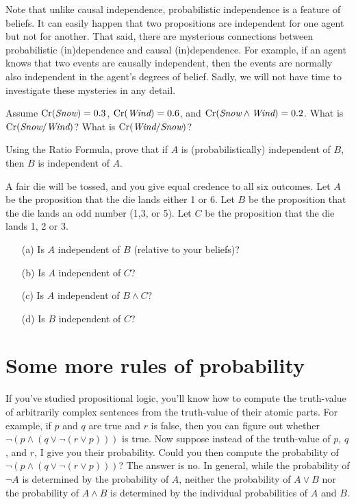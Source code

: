 Note that unlike causal independence, probabilistic independence is a
feature of beliefs. It can easily happen that two propositions are
independent for one agent but not for another. That said, there are
mysterious connections between probabilistic (in)dependence and causal
(in)dependence. For example, if an agent knows that two events are
causally independent, then the events are normally also independent in
the agent's degrees of belief. Sadly, we will not have time to
investigate these mysteries in any detail.

\newpage

\begin{exercise}
  Assume $\text{Cr}(\emph{Snow}) = 0.3$, $\text{Cr}(\emph{Wind}) = 0.6$, and $\text{Cr}(\emph{Snow} \land
  \emph{Wind}) = 0.2$. What is $\text{Cr}(\emph{Snow}/\emph{Wind})$? What is $\text{Cr}(\emph{Wind}/\emph{Snow})$?
\end{exercise}

\begin{exercise}
  Using the Ratio Formula, prove that if $A$ is (probabilistically)
  independent of $B$, then $B$ is independent of $A$. 
\end{exercise}

\begin{exercise}
  A fair die will be tossed, and you give equal credence to all six
  outcomes. Let $A$ be the proposition that the die lands either 1 or
  6. Let $B$ be the proposition that the die lands an odd number (1,3,
  or 5). Let $C$ be the proposition that the die lands 1, 2 or 3.
  \begin{enumerate}
  \itemsep0em 
  \item[(a)] Is $A$ independent of $B$ (relative to your beliefs)?
  \item[(b)] Is $A$ independent of $C$?
  \item[(c)] Is $A$ independent of $B \land C$?
  \item[(d)] Is $B$ independent of $C$?
  \end{enumerate}
  \vspace{-1.5em}
\end{exercise}

\section{Some more rules of probability}

If you've studied propositional logic, you'll know how to compute the
truth-value of arbitrarily complex sentences from the truth-value of
their atomic parts. For example, if $p$ and $q$ are true and $r$ is
false, then you can figure out whether $\neg(p \land (q \lor \neg(r
\lor p)))$ is true. Now suppose instead of the truth-value of $p$,
$q$, and $r$, I give you their probability. Could you then compute the
probability of $\neg (p \land (q \lor \neg(r \lor p)))$? The answer is
no. In general, while the probability of $\neg A$ is determined by the
probability of $A$, neither the probability of $A\lor B$ nor the
probability of $A \land B$ is determined by the individual
probabilities of $A$ and $B$.

